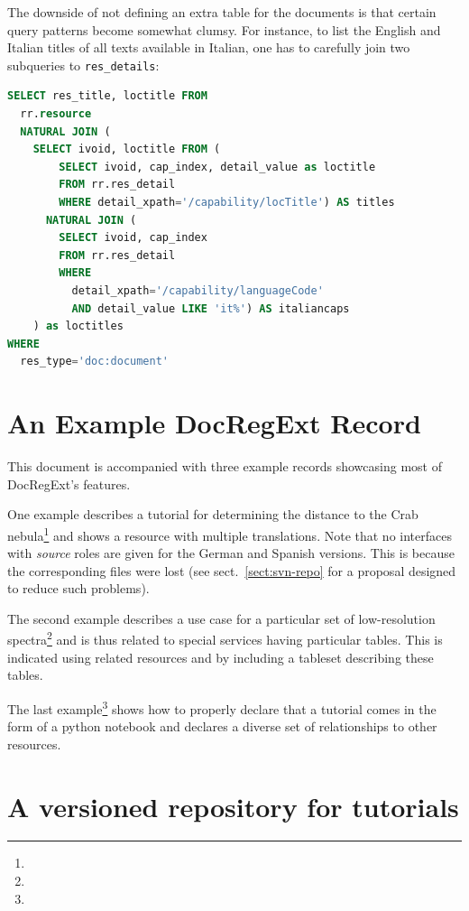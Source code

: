 \documentclass{ivoa}
\begin{document}
The downside of not defining an extra table for the documents is that
certain query patterns become somewhat clumsy.  For instance, to list
the English and Italian titles of all texts available in Italian, one
has to carefully join two subqueries to \verb|res_details|:

\begin{lstlisting}[language=SQL]
SELECT res_title, loctitle FROM
  rr.resource
  NATURAL JOIN (
    SELECT ivoid, loctitle FROM (
        SELECT ivoid, cap_index, detail_value as loctitle
        FROM rr.res_detail
        WHERE detail_xpath='/capability/locTitle') AS titles
      NATURAL JOIN (
        SELECT ivoid, cap_index
        FROM rr.res_detail
        WHERE
          detail_xpath='/capability/languageCode'
          AND detail_value LIKE 'it%') AS italiancaps
    ) as loctitles
WHERE
  res_type='doc:document'
\end{lstlisting}


\appendix

\section{An Example DocRegExt Record}

This document is accompanied with three example records showcasing most of
DocRegExt's features.

One example describes a tutorial for determining the distance to the Crab
nebula\footnote{} and shows
a resource with multiple translations.
Note that no interfaces with \textit{source} roles
are given for the German and Spanish versions.  This is because the
corresponding files were lost (see sect.~\ref{sect:svn-repo} for a
proposal designed to reduce such problems).

The second example describes a use case for a particular set of
low-resolution spectra\footnote{} and is
thus related to special services having particular tables.  This is
indicated using related resources and by including a tableset describing
these tables.

The last example\footnote{} shows how
to properly declare that a tutorial comes in the form of a python
notebook and declares a diverse set of relationships to other resources.

\section{A versioned repository for tutorials}
\end{document}
